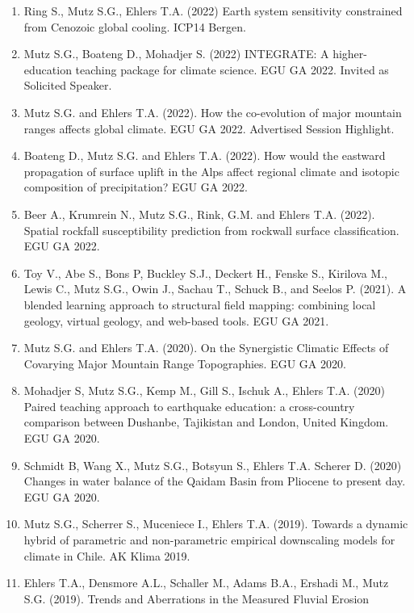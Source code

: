 \documentclass[
  letterpaper,
  DIV=11,
  numbers=noendperiod]{scrartcl}
\begin{document}
\begin{enumerate}
  Eizenhöfer P.R., McQuarrie N, Ghoshal S., Mutz S.G., Ehlers T.A.
  (2023) Drivers of Topography in Fold-thrust Belts: A Perspective from
  Central Nepal. EGU GA 2023.
\item
  Ring S., Mutz S.G., Ehlers T.A. (2022) Earth system sensitivity
  constrained from Cenozoic global cooling. ICP14 Bergen.
\item
  Mutz S.G., Boateng D., Mohadjer S. (2022) INTEGRATE: A
  higher-education teaching package for climate science. EGU GA 2022.
  Invited as Solicited Speaker.
\item
  Mutz S.G. and Ehlers T.A. (2022). How the co-evolution of major
  mountain ranges affects global climate. EGU GA 2022. Advertised
  Session Highlight.
\item
  Boateng D., Mutz S.G. and Ehlers T.A. (2022). How would the eastward
  propagation of surface uplift in the Alps affect regional climate and
  isotopic composition of precipitation? EGU GA 2022.
\item
  Beer A., Krumrein N., Mutz S.G., Rink, G.M. and Ehlers T.A. (2022).
  Spatial rockfall susceptibility prediction from rockwall surface
  classification. EGU GA 2022.
\item
  Toy V., Abe S., Bons P, Buckley S.J., Deckert H., Fenske S., Kirilova
  M., Lewis C., Mutz S.G., Owin J., Sachau T., Schuck B., and Seelos P.
  (2021). A blended learning approach to structural field mapping:
  combining local geology, virtual geology, and web-based tools. EGU GA
  2021.
\item
  Mutz S.G. and Ehlers T.A. (2020). On the Synergistic Climatic Effects
  of Covarying Major Mountain Range Topographies. EGU GA 2020.
\item
  Mohadjer S, Mutz S.G., Kemp M., Gill S., Ischuk A., Ehlers T.A. (2020)
  Paired teaching approach to earthquake education: a cross-country
  comparison between Dushanbe, Tajikistan and London, United Kingdom.
  EGU GA 2020.
\item
  Schmidt B, Wang X., Mutz S.G., Botsyun S., Ehlers T.A. Scherer D.
  (2020) Changes in water balance of the Qaidam Basin from Pliocene to
  present day. EGU GA 2020.
\item
  Mutz S.G., Scherrer S., Muceniece I., Ehlers T.A. (2019). Towards a
  dynamic hybrid of parametric and non-parametric empirical downscaling
  models for climate in Chile. AK Klima 2019.
\item
  Ehlers T.A., Densmore A.L., Schaller M., Adams B.A., Ershadi M., Mutz
  S.G. (2019). Trends and Aberrations in the Measured Fluvial Erosion

\end{enumerate}
\end{document}
